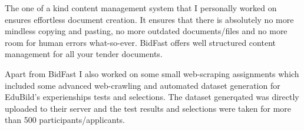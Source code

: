 \documentclass[14pt]{extarticle}
\begin{document}
\par The one of a kind content management system that I personally worked on ensures effortless document creation. It ensures that there is absolutely no more mindless copying and pasting, no more outdated documents/files and no more room for human errors what-so-ever. BidFast offers well structured content management for all your tender documents.

\par Apart from BidFast I also worked on some small web-scraping assignments which included some advanced web-crawling and automated dataset generation for EduBild's experienships tests and selections. The dataset generqated was directly uploaded to their server and the test results and selections were taken for more than 500 participants/applicants.

\newpage
\end{document}
